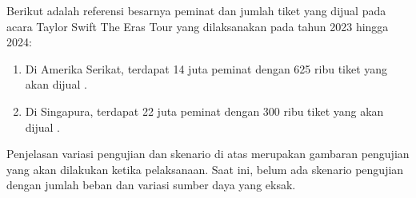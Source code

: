 Berikut adalah referensi besarnya peminat dan jumlah tiket yang dijual pada acara Taylor Swift The Eras Tour yang dilaksanakan pada tahun 2023 hingga 2024:

\begin{enumerate}
  \item Di Amerika Serikat, terdapat 14 juta peminat dengan 625 ribu tiket yang akan dijual \parencite{USTaylorSwift}.
  \item Di Singapura, terdapat 22 juta peminat dengan 300 ribu tiket yang akan dijual \parencite{asiaTaylorSwift}.
\end{enumerate}

Penjelasan variasi pengujian dan skenario di atas merupakan gambaran pengujian yang akan dilakukan ketika pelaksanaan. Saat ini, belum ada skenario pengujian dengan jumlah beban dan variasi sumber daya yang eksak.